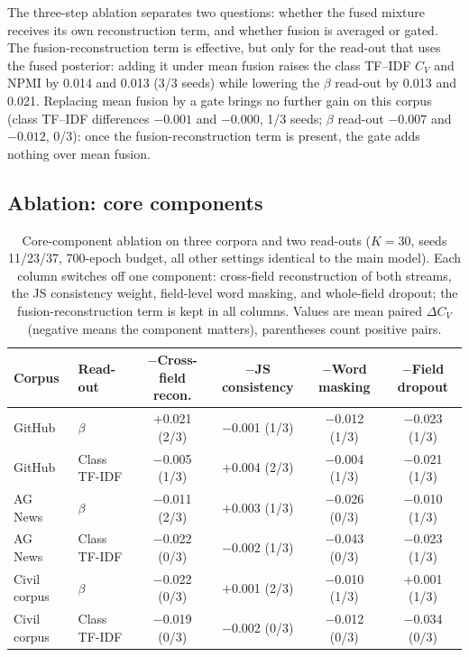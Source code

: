 \documentclass[pdflatex,sn-basic]{sn-jnl}
\begin{document}
The three-step ablation separates two questions: whether the fused mixture receives its own
reconstruction term, and whether fusion is averaged or gated. The fusion-reconstruction term is
effective, but only for the read-out that uses the fused posterior: adding it under mean fusion
raises the class TF--IDF $C_V$ and NPMI by 0.014 and 0.013 (3/3 seeds) while lowering the $\beta$
read-out by 0.013 and 0.021. Replacing mean fusion by a gate brings no further gain on this
corpus (class TF--IDF differences $-0.001$ and $-0.000$, 1/3 seeds; $\beta$ read-out $-0.007$
and $-0.012$, 0/3): once the fusion-reconstruction term is present, the gate adds nothing over
mean fusion.

\subsection{Ablation: core components}

\begin{table}[t]
\centering
\caption{Core-component ablation on three corpora and two read-outs ($K=30$, seeds 11/23/37, 700-epoch budget, all other settings identical to the main model). Each column switches off one component: cross-field reconstruction of both streams, the JS consistency weight, field-level word masking, and whole-field dropout; the fusion-reconstruction term is kept in all columns. Values are mean paired $\Delta C_V$ (negative means the component matters), parentheses count positive pairs.}
\label{tab:core-ablation}
\small
\setlength{\tabcolsep}{5pt}
\begin{tabular}{llcccc}
\toprule
Corpus & Read-out & $-$Cross-field recon. & $-$JS consistency & $-$Word masking & $-$Field dropout \\
\midrule
GitHub & $\beta$ & $+$0.021 (2/3) & $-$0.001 (1/3) & $-$0.012 (1/3) & $-$0.023 (1/3) \\
GitHub & Class TF-IDF & $-$0.005 (1/3) & $+$0.004 (2/3) & $-$0.004 (1/3) & $-$0.021 (1/3) \\
\midrule
AG News & $\beta$ & $-$0.011 (2/3) & $+$0.003 (1/3) & $-$0.026 (0/3) & $-$0.010 (1/3) \\
AG News & Class TF-IDF & $-$0.022 (0/3) & $-$0.002 (1/3) & $-$0.043 (0/3) & $-$0.023 (1/3) \\
\midrule
Civil corpus & $\beta$ & $-$0.022 (0/3) & $+$0.001 (2/3) & $-$0.010 (1/3) & $+$0.001 (1/3) \\
Civil corpus & Class TF-IDF & $-$0.019 (0/3) & $-$0.002 (0/3) & $-$0.012 (0/3) & $-$0.034 (0/3) \\
\bottomrule
\end{tabular}
\end{table}
\end{document}
